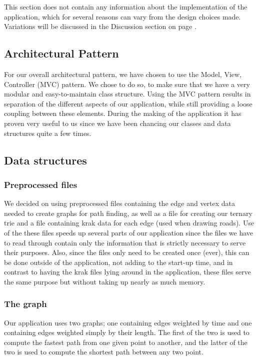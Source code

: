 \documentclass[a4paper,11pt]{article}
\begin{document}
This section does not contain any information about the implementation of the application, which for several reasons can vary from the design choices made. Variations will be discussed in the Discussion section on page \pageref{sec:Discussion}.

\subsection{Architectural Pattern}
\label{sub:Design Pattern}
For our overall architectural pattern, we have chosen to use the Model, View, Controller (MVC) pattern. We chose to do so, to make sure that we have a very modular and easy-to-maintain class structure. Using the MVC pattern results in separation of the different aspects of our application, while still providing a loose coupling between these elements. During the making of the application it has proven very useful to us since we have been chancing our classes and data structures quite a few times. 

\subsection{Data structures}

\subsubsection{Preprocessed files}
We decided on using preprocessed files containing the edge and vertex data needed to create graphs for path finding, as well as a file for creating our ternary trie and a file containing krak data for each edge (used when drawing roads). Use of the these files speeds up several parts of our application since the files we have to read through contain only the information that is strictly necessary to serve their purposes. Also, since the files only need to be created once (ever), this can be done outside of the application, not adding to the start-up time, and in contrast to having the krak files lying around in the application, these files serve the same purpose but without taking up nearly as much memory.

\subsubsection{The graph}
Our application uses two graphs; one containing edges weighted by time and one containing edges weighted simply by their length. The first of the two is used to compute the fastest path from one given point to another, and the latter of the two is used to compute the shortest path between any two point. 
\end{document}
